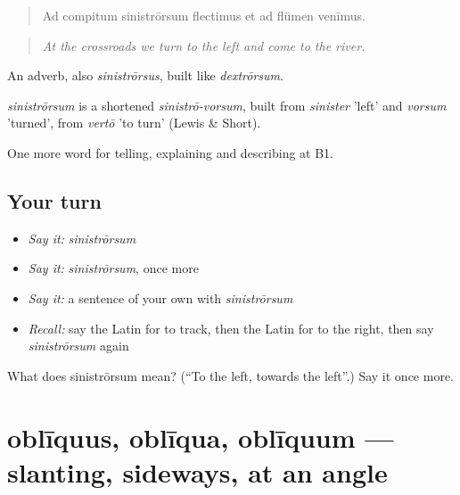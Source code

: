 \begin{quote}
Ad compitum sinistrōrsum flectimus et ad flūmen venīmus.
\end{quote}

\begin{quote}
\emph{At the crossroads we turn to the left and come to the river.}
\end{quote}

An adverb, also \emph{sinistrōrsus}, built like \emph{dextrōrsum}.

\begin{cousinweb}
\emph{sinistrōrsum} is a shortened \emph{sinistrō-vorsum}, built from \emph{sinister} 'left' and \emph{vorsum} 'turned', from \emph{vertō} 'to turn' (Lewis \& Short).
\end{cousinweb}

\begin{grammarlens}[title={What you've built}]
One more word for telling, explaining and describing at B1.
\end{grammarlens}

\subsection*{Your turn}
\begin{itemize}
\raggedright
  \item \emph{Say it:} \emph{sinistrōrsum}
  \item \emph{Say it:} \emph{sinistrōrsum}, once more
  \item \emph{Say it:} a sentence of your own with \emph{sinistrōrsum}
  \item \emph{Recall:} say the Latin for to track, then the Latin for to the right, then say \emph{sinistrōrsum} again
\end{itemize}

\begin{tcolorbox}[breakable,colback=teal!4,colframe=teal!35!black,title={Before you move on}]
What does sinistrōrsum mean? (\textquotedblleft{}To the left, towards the left\textquotedblright{}.) Say it once more.
\end{tcolorbox}
\section[oblīquus, oblīqua, oblīquum]{oblīquus, oblīqua, oblīquum — slanting, sideways, at an angle}

\label{lesson:LA-C454-obliquus}



